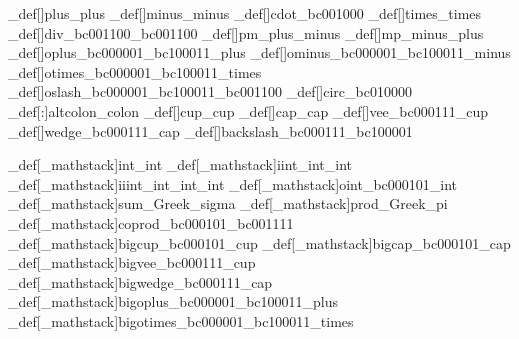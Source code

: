 


\brl@char_def[]{plus}{\brl@char@alias_plus}
\brl@char_def[]{minus}{\brl@char@alias_minus}
\brl@char_def[]{cdot}{\brl@char_bc001000}
\brl@char_def[]{times}{\brl@char@alias_times}
\brl@char_def[]{div}{\brl@char_bc001100\brl@char_bc001100}
\brl@char_def[]{pm}{\brl@char@alias_plus\brl@char@alias_minus}
\brl@char_def[]{mp}{\brl@char@alias_minus\brl@char@alias_plus}
\brl@char_def[]{oplus}{\brl@char_bc000001\brl@char_bc100011\brl@char@alias_plus}
\brl@char_def[]{ominus}{\brl@char_bc000001\brl@char_bc100011\brl@char@alias_minus}
\brl@char_def[]{otimes}{\brl@char_bc000001\brl@char_bc100011\brl@char@alias_times}
\brl@char_def[]{oslash}{\brl@char_bc000001\brl@char_bc100011\brl@char_bc001100}
\brl@char_def[]{circ}{\brl@char_bc010000}
\brl@char_def[:]{altcolon}{\brl@char@alias_colon}
\brl@char_def[]{cup}{\brl@char@alias_cup}
\brl@char_def[]{cap}{\brl@char@alias_cap}
\brl@char_def[]{vee}{\brl@char_bc000111\brl@char@alias_cup}
\brl@char_def[]{wedge}{\brl@char_bc000111\brl@char@alias_cap}
\brl@char_def[]{backslash}{\brl@char_bc000111\brl@char_bc100001}



\brl@char_def[\brl@char_mathstack{}{}]{int}{\brl@char@alias_int}
\brl@char_def[\brl@char_mathstack{}{}]{iint}{\brl@char@alias_int\brl@char@alias_int}
\brl@char_def[\brl@char_mathstack{}{}]{iiint}{\brl@char@alias_int\brl@char@alias_int\brl@char@alias_int}
\brl@char_def[\brl@char_mathstack{}{}]{oint}{\brl@char_bc000101\brl@char@alias_int}
\brl@char_def[\brl@char_mathstack{}{}]{sum}{\brl@char@alias_Greek\brl@char@alias_sigma}
\brl@char_def[\brl@char_mathstack{}{}]{prod}{\brl@char@alias_Greek\brl@char@alias_pi}
\brl@char_def[\brl@char_mathstack{}{}]{coprod}{\brl@char_bc000101\brl@char_bc001111}
\brl@char_def[\brl@char_mathstack{}{}]{bigcup}{\brl@char_bc000101\brl@char@alias_cup}
\brl@char_def[\brl@char_mathstack{}{}]{bigcap}{\brl@char_bc000101\brl@char@alias_cap}
\brl@char_def[\brl@char_mathstack{}{}]{bigvee}{\brl@char_bc000111\brl@char@alias_cup}
\brl@char_def[\brl@char_mathstack{}{}]{bigwedge}{\brl@char_bc000111\brl@char@alias_cap}
\brl@char_def[\brl@char_mathstack{}{}]{bigoplus}{\brl@char_bc000001\brl@char_bc100011\brl@char@alias_plus}
\brl@char_def[\brl@char_mathstack{}{}]{bigotimes}{\brl@char_bc000001\brl@char_bc100011\brl@char@alias_times}



